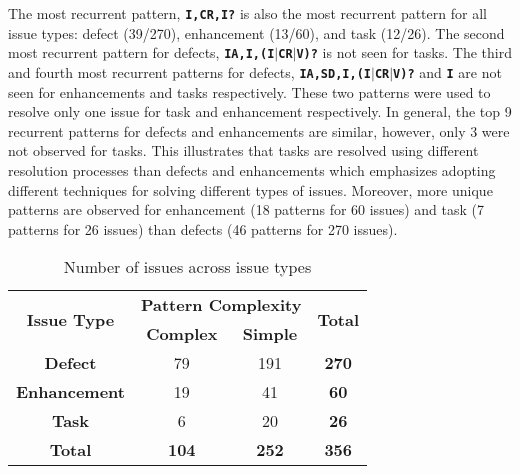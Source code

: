The most recurrent pattern, \ie \texttt{\textbf{I,CR,I?}} is also the most recurrent pattern for all issue types: defect (39/270), enhancement (13/60), and task (12/26). 
The second most recurrent pattern for defects, \ie \texttt{\textbf{IA,I,(I$\mid$CR$\mid$V)?}} is not seen for tasks. The third and fourth most recurrent patterns for defects, \ie \texttt{\textbf{IA,SD,I,(I$\mid$CR$\mid$V)?}} and \texttt{\textbf{I}} are not seen for enhancements and tasks respectively. These two patterns were used to resolve only one issue for task and enhancement respectively.
In general, the top 9 recurrent patterns for defects and enhancements are similar, however, only 3 were not observed for tasks. This illustrates that tasks are resolved using different resolution processes than defects and enhancements which emphasizes adopting different techniques for solving different types of issues. Moreover, more unique patterns are observed for enhancement (18 patterns for 60 issues) and task (7 patterns for 26 issues) than defects (46 patterns for 270 issues).


\begin{table}[]
\caption{Number of issues across issue types}
\label{tab:patterns_issue_types}
\centering
\begin{tabular}{c|cc|c}
\hline
\multirow{2}{*}{\textbf{Issue Type}} & \multicolumn{2}{c|}{\textbf{Pattern Complexity}}        & \multirow{2}{*}{\textbf{Total}} \\ \cline{2-3}
                                     & \multicolumn{1}{c|}{\textbf{Complex}} & \textbf{Simple} &                                 \\ \hline
\textbf{Defect}                      & \multicolumn{1}{c|}{79}               & 191             & \textbf{270}                    \\ \hline
\textbf{Enhancement}                 & \multicolumn{1}{c|}{19}               & 41              & \textbf{60}                     \\ \hline
\textbf{Task}                        & \multicolumn{1}{c|}{6}                & 20              & \textbf{26}                     \\ \hline
\textbf{Total}                       & \multicolumn{1}{c|}{\textbf{104}}     & \textbf{252}    & \textbf{356}                    \\ \hline
\end{tabular}
\end{table}

